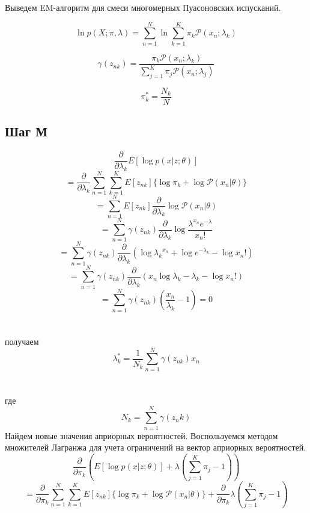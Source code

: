 \documentclass{matmex-diploma}
\begin{document}
Выведем EM-алгоритм для смеси многомерных Пуасоновских испусканий.

\begin{equation}
\ln p(X;\pi,\lambda) = \sum_{n=1}^N \ln{\sum_{k=1}^K} \pi_k \mathcal{P}(x_n;\lambda_k)
\end{equation}

\begin{equation}
\gamma(z_{nk}) = \frac{\pi_k\mathcal{P}(x_n;\lambda_k)}{\sum_{j=1}^K\pi_j\mathcal{P}(x_n;\lambda_j)}
\end{equation}

\begin{equation}
\pi_{k}^* = \frac{N_k}{N}
\end{equation}

\subsection*{Шаг М}
$$\frac{\partial}{\partial \lambda_k}E[\log p(x|z;\theta)]$$
$$=\frac{\partial}{\partial \lambda_k}\sum_{n=1}^N \sum_{k=1}^K
E[z_{nk}]\{\log \pi_k + \log \mathcal{P}(x_n|\theta)\}$$
$$= \sum_{n=1}^N E[z_{nk}] \frac{\partial}{\partial \lambda_k} \log \mathcal{P}(x_n|\theta)$$
$$= \sum_{n=1}^N \gamma(z_{nk}) \frac{\partial}{\partial \lambda_k} \log {\frac{\lambda^{x_n} e^{-\lambda}}{x_n!}}$$
$$= \sum_{n=1}^N \gamma(z_{nk}) \frac{\partial}{\partial \lambda_k} (\log {\lambda_k}^{x_n} + \log e^{-\lambda_k} - \log x_n! )$$
$$= \sum_{n=1}^N \gamma(z_{nk}) \frac{\partial}{\partial \lambda_k} (x_n \log \lambda_k - \lambda_k - \log x_n! )$$
$$= \sum_{n=1}^N \gamma(z_{nk}) (\frac{x_n}{\lambda_k} - 1)= 0$$
\\\\
получаем
\begin{equation}
\lambda_k^* = \frac{1}{N_k}\sum_{n=1}^N\gamma(z_{nk})x_n
\end{equation}
\\\\
где
\begin{equation}
N_k = \sum_{n=1}^N\gamma(z_nk)
\end{equation}
Найдем новые значения априорных вероятностей.
Воспользуемся методом множителей Лагранжа для учета ограничений на вектор априорных вероятностей. 
$$\frac{\partial}{\partial \pi_k}( E[\log p(x|z;\theta)] + \lambda(\sum_{j=1}^K \pi_j - 1))$$
$$= \frac{\partial}{\partial \pi_k}\sum_{n=1}^N \sum_{k=1}^K
E[z_{nk}]\{\log \pi_k + \log \mathcal{P}(x_n|\theta)\} + \frac{\partial}{\partial \pi_k}\lambda(\sum_{j=1}^K \pi_j - 1)$$
\end{document}
